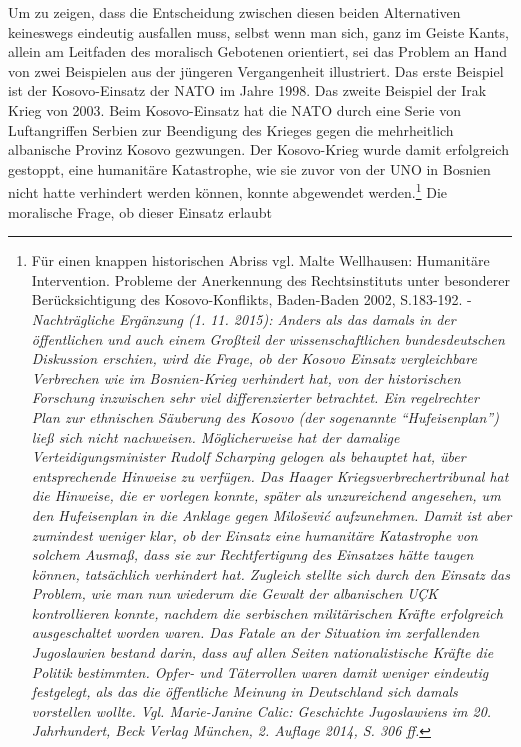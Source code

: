 \documentclass[12pt,a4paper,ngerman]{article}
\begin{document}
Um zu zeigen, dass die Entscheidung zwischen diesen beiden
Alternativen keineswegs eindeutig ausfallen muss, selbst wenn man
sich, ganz im Geiste Kants, allein am Leitfaden des moralisch
Gebotenen orientiert, sei das Problem an Hand von zwei Beispielen aus
der jüngeren Vergangenheit illustriert. Das erste Beispiel ist der
Kosovo-Einsatz der NATO im Jahre 1998. Das zweite Beispiel der Irak
Krieg von 2003. Beim Kosovo-Einsatz hat die NATO durch eine Serie von
Luftangriffen Serbien zur Beendigung des Krieges gegen die
mehrheitlich albanische Provinz Kosovo gezwungen. Der Kosovo-Krieg
wurde damit erfolgreich gestoppt, eine humanitäre Katastrophe, wie sie
zuvor von der UNO in Bosnien nicht hatte verhindert werden können,
konnte abgewendet werden.\footnote{Für einen knappen historischen
  Abriss vgl. Malte Wellhausen: Humanitäre Intervention. Probleme der
  Anerkennung des Rechtsinstituts unter besonderer Berücksichtigung
  des Kosovo-Konflikts, Baden-Baden 2002, S.183-192. - {\em
    Nachträgliche Ergänzung (1. 11. 2015): Anders als das damals in
    der öffentlichen und auch einem Großteil der wissenschaftlichen
    bundesdeutschen Diskussion erschien, wird die Frage, ob der Kosovo
    Einsatz vergleichbare Verbrechen wie im Bosnien-Krieg verhindert
    hat, von der historischen Forschung inzwischen sehr viel
    differenzierter betrachtet. Ein regelrechter Plan zur ethnischen
    Säuberung des Kosovo (der sogenannte ``Hufeisenplan'') ließ sich
    nicht nachweisen. Möglicherweise hat der damalige
    Verteidigungsminister Rudolf Scharping gelogen als behauptet hat,
    über entsprechende Hinweise zu verfügen. Das Haager
    Kriegsverbrechertribunal hat die Hinweise, die er vorlegen konnte,
    später als unzureichend angesehen, um den Hufeisenplan in die
    Anklage gegen Milošević aufzunehmen. Damit ist aber zumindest
    weniger klar, ob der Einsatz eine humanitäre Katastrophe von
    solchem Ausmaß, dass sie zur Rechtfertigung des Einsatzes hätte
    taugen können, tatsächlich verhindert hat. Zugleich stellte sich
    durch den Einsatz das Problem, wie man nun wiederum die Gewalt der
    albanischen UÇK kontrollieren konnte, nachdem die serbischen
    militärischen Kräfte erfolgreich ausgeschaltet worden waren. Das
    Fatale an der Situation im zerfallenden Jugoslawien bestand darin,
    dass auf allen Seiten nationalistische Kräfte die Politik
    bestimmten. Opfer- und Täterrollen waren damit weniger eindeutig
    festgelegt, als das die öffentliche Meinung in Deutschland sich
    damals vorstellen wollte. Vgl. Marie-Janine Calic: Geschichte
    Jugoslawiens im 20. Jahrhundert, Beck Verlag München, 2. Auflage
    2014, S. 306 ff.}} Die moralische Frage, ob dieser Einsatz erlaubt
\end{document}
